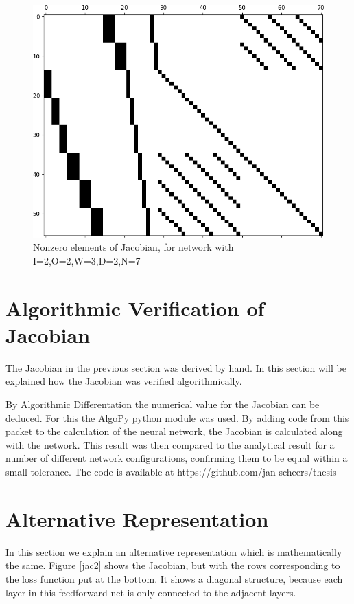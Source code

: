 \begin{figure}[p]
  \centering
  \includegraphics[width=\textwidth]{jac.png}
  \caption{Nonzero elements of Jacobian, for network with I=2,O=2,W=3,D=2,N=7}
  \label{jac}
\end{figure}

\section{Algorithmic Verification of Jacobian}
The Jacobian in the previous section was derived by hand. In this section will be explained how the Jacobian was verified algorithmically.

By Algorithmic Differentation the numerical value for the Jacobian can be deduced. For this the AlgoPy python module was used. By adding code from this packet to the calculation of the neural network, the Jacobian is calculated along with the network. This result was then compared to the analytical result for a number of different network configurations, confirming them to be equal within a small tolerance. The code is available at https://github.com/jan-scheers/thesis 

\section{Alternative Representation}

In this section we explain an alternative representation which is mathematically the same. Figure \ref{jac2} shows the Jacobian, but with the rows corresponding to the loss function put at the bottom. It shows a diagonal structure, because each layer in this feedforward net is only connected to the adjacent layers.


